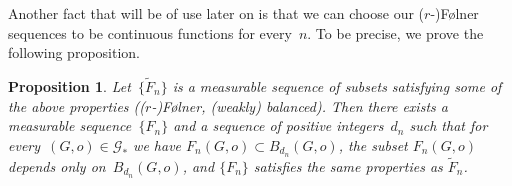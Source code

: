 \documentclass[english]{article}
\newtheorem{proposition}[lemma]{Proposition}
\theoremstyle{definition}
\begin{document}
Another fact that will be of use later on is that we can choose our ($r$-)F\o lner sequences to be continuous functions for every~$n$. To be precise, we prove the following proposition. 
\begin{proposition}\label{proposition:Folner_continuous}
Let~$\{\tilde F_n\}$ is a measurable sequence of subsets satisfying some of the above properties (($r$-)F\o lner, (weakly) balanced). Then there exists a measurable sequence~$\{F_n\}$ and a sequence of positive integers~$d_n$ such that for every~$(G,o) \in \mathcal{G}_*$ we have $F_n(G,o) \subset B_{d_n}(G,o)$, the subset $F_n(G,o)$ depends only on~$B_{d_n}(G,o)$, and $\{F_n\}$ satisfies the same properties as $\tilde F_n$. 
\end{proposition}
\end{document}
